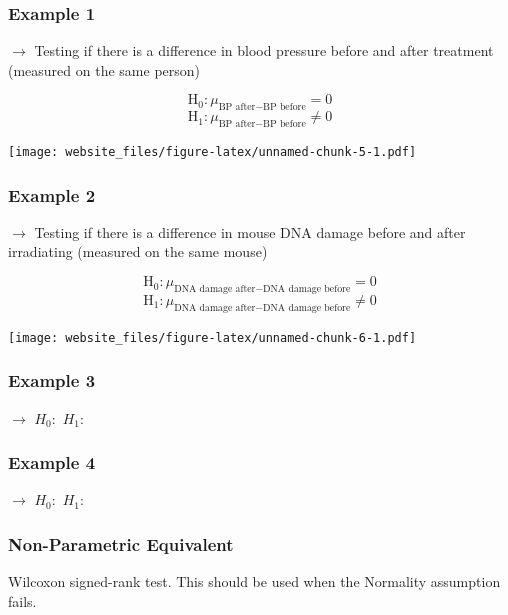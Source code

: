 \documentclass[12pt,]{article}
\begin{document}
\subsubsection{Example 1}\label{example-1-1}

\(\rightarrow\) Testing if there is a difference in blood pressure
before and after treatment (measured on the same person)

\[\text{H}_0: \mu_{\text{BP after}-\text{BP before}} = 0\]
\[\text{H}_1: \mu_{\text{BP after}-\text{BP before}} \ne 0\]

\texttt{[image: website\_files/figure-latex/unnamed-chunk-5-1.pdf]}

\newpage

\subsubsection{Example 2}\label{example-2-1}

\(\rightarrow\) Testing if there is a difference in mouse DNA damage
before and after irradiating (measured on the same mouse)

\[\text{H}_0: \mu_{\text{DNA damage after}-\text{DNA damage before}} = 0\]
\[\text{H}_1: \mu_{\text{DNA damage after}-\text{DNA damage before}} \ne 0\]

\texttt{[image: website\_files/figure-latex/unnamed-chunk-6-1.pdf]}

\subsubsection{Example 3}\label{example-3-1}

\(\rightarrow\) \hfill \break
\hfill \break
\hfill \break
\(H_0:\) \hfill \break
\hfill \break
\hfill \break
\(H_1:\)

\newpage

\subsubsection{Example 4}\label{example-4-1}

\(\rightarrow\) \hfill \break
\hfill \break
\hfill \break
\(H_0:\) \hfill \break
\hfill \break
\hfill \break
\(H_1:\)

\subsubsection{Non-Parametric
Equivalent}\label{non-parametric-equivalent}

Wilcoxon signed-rank test. This should be used when the Normality
assumption fails.
\end{document}
